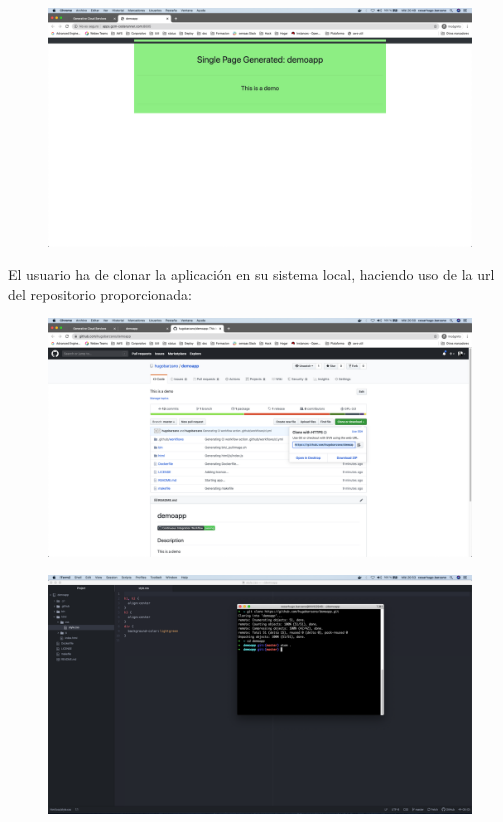 \documentclass[a4paper,11pt]{book}
\begin{document}
\begin{figure}[H]
\centering
\includegraphics[scale=0.2]{imagenes/casouso/2_2.png}
\caption{   }
\end{figure}

 El usuario ha de clonar la aplicación en su sistema local, haciendo uso de la url del repositorio proporcionada:
 
 \begin{figure}[H]
\centering
\includegraphics[scale=0.2]{imagenes/casouso/2_3.png}
\caption{   }
\end{figure}


\begin{figure}[H]
\centering
\includegraphics[scale=0.2]{imagenes/casouso/2_4.png}
\caption{   }
\end{figure}
\end{document}
